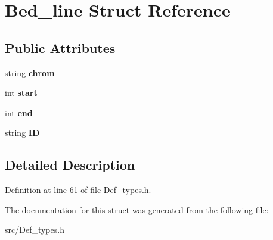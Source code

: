\hypertarget{struct_bed__line}{}\section{Bed\+\_\+line Struct Reference}
\label{struct_bed__line}
\subsection*{Public Attributes}
\begin{DoxyCompactItemize}
\item 
\mbox{\label{struct_bed__line_a6929a5165ce7483f033ea33477cc5045}} 
string {\bfseries chrom}
\item 
\mbox{\label{struct_bed__line_a0cd4bf4cb13f713b34bcc6d89d93b5b2}} 
int {\bfseries start}
\item 
\mbox{\label{struct_bed__line_ab51863f0a6fcd60056d0a00756ce47c0}} 
int {\bfseries end}
\item 
\mbox{\label{struct_bed__line_a5ce608d60345769ff0776abf47854d3a}} 
string {\bfseries ID}
\end{DoxyCompactItemize}


\subsection{Detailed Description}


Definition at line 61 of file Def\+\_\+types.\+h.



The documentation for this struct was generated from the following file\+:\begin{DoxyCompactItemize}
\item 
src/Def\+\_\+types.\+h\end{DoxyCompactItemize}
